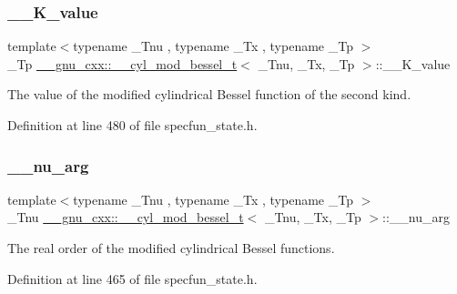 \subsubsection{\texorpdfstring{\+\_\+\+\_\+\+K\+\_\+value}{\_\_K\_value}}
{\footnotesize\ttfamily template$<$typename \+\_\+\+Tnu , typename \+\_\+\+Tx , typename \+\_\+\+Tp $>$ \\
\+\_\+\+Tp \hyperlink{struct____gnu__cxx_1_1____cyl__mod__bessel__t}{\+\_\+\+\_\+gnu\+\_\+cxx\+::\+\_\+\+\_\+cyl\+\_\+mod\+\_\+bessel\+\_\+t}$<$ \+\_\+\+Tnu, \+\_\+\+Tx, \+\_\+\+Tp $>$\+::\+\_\+\+\_\+\+K\+\_\+value}



The value of the modified cylindrical Bessel function of the second kind. 



Definition at line 480 of file specfun\+\_\+state.\+h.

\mbox{\label{struct____gnu__cxx_1_1____cyl__mod__bessel__t_a482597cb5cc7de3449debeb0a451a757}} 
\subsubsection{\texorpdfstring{\+\_\+\+\_\+nu\+\_\+arg}{\_\_nu\_arg}}
{\footnotesize\ttfamily template$<$typename \+\_\+\+Tnu , typename \+\_\+\+Tx , typename \+\_\+\+Tp $>$ \\
\+\_\+\+Tnu \hyperlink{struct____gnu__cxx_1_1____cyl__mod__bessel__t}{\+\_\+\+\_\+gnu\+\_\+cxx\+::\+\_\+\+\_\+cyl\+\_\+mod\+\_\+bessel\+\_\+t}$<$ \+\_\+\+Tnu, \+\_\+\+Tx, \+\_\+\+Tp $>$\+::\+\_\+\+\_\+nu\+\_\+arg}



The real order of the modified cylindrical Bessel functions. 



Definition at line 465 of file specfun\+\_\+state.\+h.

\mbox{\label{struct____gnu__cxx_1_1____cyl__mod__bessel__t_ad23dcffe64b074804b84abe4d0da7515}} 
